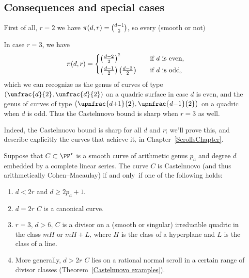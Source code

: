 \subsection*{Consequences and special cases}

 First of all, 
$r=2$ we have $\pi(d,r) = \tbinom{d-1}{2}$,
 so every 
(smooth or not) 
%

 In case $r=3$, we have
 $$
 \pi(d,r) =
 \begin{cases}
 \left(\frac{d-2}{2} \right)^2& \quad \text{if $d$ is even}, \\
\noalign{\vskip3pt}
 \left(\frac{d-1}{2} \right)\left(\frac{d-3}{2} \right)& \quad \text{if
 $d$ is odd},
 \end{cases}
 $$
 which we can recognize as the genus of curves of type $(\unfrac{d}{2},
 \unfrac{d}{2} )$ on a quadric surface in case $d$ is even, and the genus
 of curves of type
 $\bigl(\upnfrac{d{+}1}{2}, \upnfrac{d{-}1}{2} \bigr)$ 
on a quadric when $d$ is odd. Thus
the Castelnuovo bound is sharp when $r=3$ as well.

Indeed, the Castelnuovo bound is sharp for all $d$ and $r$; we'll
prove this, and describe explicitly the curves that achieve it, in
Chapter~\ref{ScrollsChapter}.


\begin{corollary}\label{list of Castelnuovo curves}
Suppose that $C\subset \PP^r$ is a smooth curve of arithmetic genus
$p_{a}$ and degree $d$ embedded by a complete linear series. The curve
$C$ is  Castelnuovo (and thus arithmetically Cohen--Macaulay) if and
only~if one of the following 
holds:
\begin{enumerate}
\item  $d<2r$ and  $d \geq 2p_a+1$.
\item $d=2r$ 
$C$ is a canonical curve.
\item $r=3$, $d>6$, 
$C$ is a divisor on a (smooth or singular)
irreducible quadric in the class $mH$ or $mH+L$, where $H$ is the class
of a hyperplane and $L$ is the class of a line.
\item  More generally,  $d>2r$ 
$C$ lies on a rational normal scroll in a certain range of divisor classes
\rm
(Theorem~\ref{Castelnuovo examples}).
\end{enumerate}
\end{corollary}

